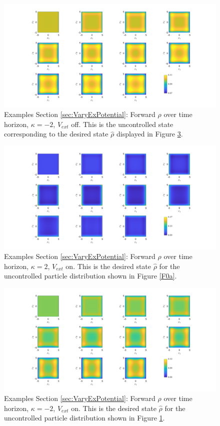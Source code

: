 \documentclass[11pt, a4paper]{article}
\theoremstyle{definition}
\newcommand{\hr}{\widehat \rho}
\begin{document}
\begin{figure}[h]
	\centering
	\includegraphics[scale=0.35]{rhokn05.png}
	\caption{Examples Section \ref{sec:VaryExPotential}: Forward $\rho$ over time horizon, $\kappa = - 2$, $V_{ext}$ off. This is the uncontrolled state corresponding to the desired state $\hr$ displayed in Figure \ref{F2b}.} 
	\label{F0b}
\end{figure}



\begin{figure}[h]
	\centering
	\includegraphics[scale=0.35]{rhok05V.png}
	\caption{Examples Section \ref{sec:VaryExPotential}: Forward $\rho$ over time horizon, $\kappa = 2$, $V_{ext}$ on. This is the desired state $\hr$ for the uncontrolled particle distribution shown in Figure \ref{F0a}.} 
	\label{F2a}
\end{figure}
\begin{figure}[h]
	\centering
	\includegraphics[scale=0.35]{rhokn05V.png}
	\caption{Examples Section \ref{sec:VaryExPotential}: Forward $\rho$ over time horizon, $\kappa = - 2$, $V_{ext}$ on. This is the desired state $\hr$ for the uncontrolled particle distribution shown in Figure \ref{F0b}.} 
	\label{F2b}
\end{figure}
\end{document}
